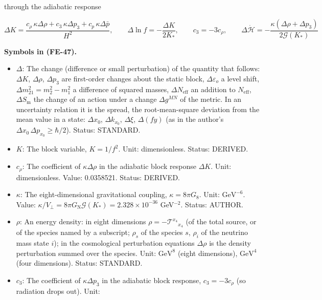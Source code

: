 \documentclass[
  10pt,
]{article}
\providecommand{\tightlist}{%
  \setlength{\itemsep}{0pt}\setlength{\parskip}{0pt}}
\begin{document}
through the adiabatic response

\[
\Delta K = \frac{c_\rho\,\kappa\Delta\rho + c_3\,\kappa\Delta p_3 + c_p\,\kappa\Delta\bar p}{H^2},\qquad
\Delta\ln f = -\frac{\Delta K}{2K_*},\qquad c_3 = -3c_\rho,\qquad
\Delta\dot{\mathcal{H}} = -\frac{\kappa(\Delta\rho + \Delta p_3)}{2\mathcal{G}(K_*)} \tag{FE-47}
\]

\textbf{Symbols in (FE-47).}

\begin{itemize}
\tightlist
\item
  \(\Delta\): The change (difference or small perturbation) of the
  quantity that follows: \(\Delta K\), \(\Delta\rho\), \(\Delta p_3\)
  are first-order changes about the static block,
  \(\Delta\varepsilon_o\) a level shift,
  \(\Delta m^2_{21} = m_2^2 - m_1^2\) a difference of squared masses,
  \(\Delta N_{\mathrm{eff}}\) an addition to \(N_{\mathrm{eff}}\),
  \(\Delta S_{\mathrm{m}}\) the change of an action under a change
  \(\Delta g^{MN}\) of the metric. In an uncertainty relation it is the
  spread, the root-mean-square deviation from the mean value in a state:
  \(\Delta x_0\), \(\Delta k_{x_0}\), \(\Delta\xi\), \(\Delta(fy)\) (as
  in the author's \(\Delta x_0\,\Delta p_{x_0} \ge \hbar/2\)). Status:
  STANDARD.
\item
  \(K\): The block variable, \(K = 1/f^2\). Unit: dimensionless. Status:
  DERIVED.
\item
  \(c_\rho\): The coefficient of \(\kappa\Delta\rho\) in the adiabatic
  block response \(\Delta K\). Unit: dimensionless. Value: 0.0358521.
  Status: DERIVED.
\item
  \(\kappa\): The eight-dimensional gravitational coupling,
  \(\kappa = 8\pi G_8\). Unit: \(\mathrm{GeV}^{-6}\). Value:
  \(\kappa/V_\perp = 8\pi G_{\mathrm{N}}\mathcal{G}(K_*) = 2.328\times10^{-36}\)
  GeV\(^{-2}\). Status: AUTHOR.
\item
  \(\rho\): An energy density: in eight dimensions
  \(\rho = -\mathcal{T}^{x_4}{}_{x_4}\) (of the total source, or of the
  species named by a subscript; \(\rho_s\) of the species \(s\),
  \(\rho_i\) of the neutrino mass state \(i\)); in the cosmological
  perturbation equations \(\Delta\rho\) is the density perturbation
  summed over the species. Unit: \(\mathrm{GeV}^{8}\) (eight
  dimensions), \(\mathrm{GeV}^{4}\) (four dimensions). Status: STANDARD.
\item
  \(c_3\): The coefficient of \(\kappa\Delta p_3\) in the adiabatic
  block response, \(c_3 = -3c_\rho\) (so radiation drops out). Unit:

\end{itemize}
\end{document}
